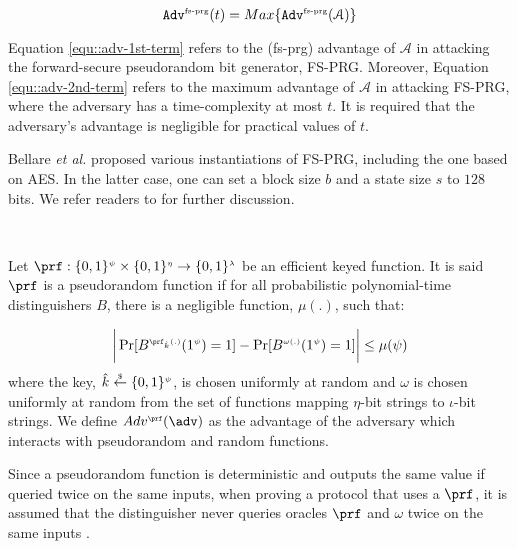 \begin{equation}\label{equ::adv-2nd-term}
\mathtt{Adv}^{\scriptscriptstyle \text{fs-prg}}(t)= Max\{\mathtt{Adv}^{\scriptscriptstyle \text{fs-prg}}(\mathcal{A})\}
\end{equation}


Equation \ref{equ::adv-1st-term}  refers to the (fs-prg) advantage of $\mathcal{A}$ in attacking the forward-secure pseudorandom bit generator, FS-PRG. Moreover, Equation \ref{equ::adv-2nd-term} refers to the maximum advantage of $\mathcal{A}$ in attacking FS-PRG, where the adversary has a time-complexity at most $t$. It is required that the adversary's advantage is negligible for practical values of $t$. 




Bellare \textit{et al.} \cite{BellareY03} proposed various instantiations of FS-PRG, including the one based on AES. In the latter case, one can set a block size $b$ and a state size $s$ to $128$ bits. We refer readers to \cite{BellareY03} for further discussion. 


\

\begin{definition} Let $\prf:\{0,1\}^{\sss\psi}\times \{0,1\}^{\sss \eta}\rightarrow \{0,1\}^{\sss  \lambda}$ be an efficient  keyed function. It is said $\prf$ is a pseudorandom function if for all probabilistic polynomial-time distinguishers $B$, there is a negligible function, $\mu(.)$, such that:
%

\begin{equation*}
\bigg | \Pr[B^{\sss \prf_{\hat{k}}(.)}(1^{\sss \psi})=1]- \Pr[B^{\sss \omega(.)}(1^{\sss \psi})=1] \bigg |\leq\mu(\psi)
\end{equation*}
%
where  the key, $\hat{k}\stackrel{\scriptscriptstyle\$}\leftarrow\{0,1\}^{\scriptscriptstyle\psi}$, is chosen uniformly at random and $\omega$ is chosen uniformly at random from the set of functions mapping $\eta$-bit strings to $\iota$-bit strings. We define $Adv^{\sss\prf}(\adv)$ as the advantage of the adversary which interacts with pseudorandom and random functions. 

\end{definition}

Since a pseudorandom function is deterministic and outputs the same value if queried twice on the same inputs, when proving a protocol that uses a $\prf$, it is assumed that the distinguisher never queries oracles $\prf$ and $\omega$ twice on the same inputs \cite{KatzLindell2014}. 


